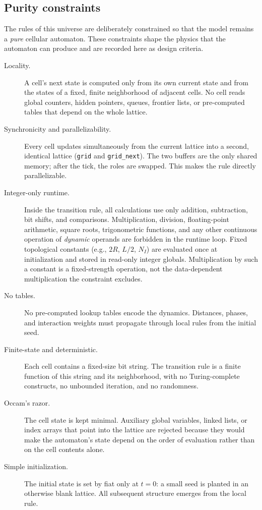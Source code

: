 \documentclass{ijuc}
\begin{document}
\subsection{Purity constraints}
\label{subsec:purity}

The rules of this universe are deliberately constrained so that the model remains a \emph{pure} cellular automaton. These constraints shape the physics that the automaton can produce and are recorded here as design criteria.

\begin{description}
\item[Locality.] A cell's next state is computed only from its own current state and from the states of a fixed, finite neighborhood of adjacent cells. No cell reads global counters, hidden pointers, queues, frontier lists, or pre-computed tables that depend on the whole lattice.
\item[Synchronicity and parallelizability.] Every cell updates simultaneously from the current lattice into a second, identical lattice (\texttt{grid} and \texttt{grid\_next}). The two buffers are the only shared memory; after the tick, the roles are swapped. This makes the rule directly parallelizable.
\item[Integer-only runtime.] Inside the transition rule, all calculations use only addition, subtraction, bit shifts, and comparisons. Multiplication, division, floating-point arithmetic, square roots, trigonometric functions, and any other continuous operation of \emph{dynamic} operands are forbidden in the runtime loop. Fixed topological constants (e.g., $2R$, $L/2$, $N_I$) are evaluated once at initialization and stored in read-only integer globals. Multiplication by such a constant is a fixed-strength operation, not the data-dependent multiplication the constraint excludes.
\item[No tables.] No pre-computed lookup tables encode the dynamics. Distances, phases, and interaction weights must propagate through local rules from the initial seed.
\item[Finite-state and deterministic.] Each cell contains a fixed-size bit string. The transition rule is a finite function of this string and its neighborhood, with no Turing-complete constructs, no unbounded iteration, and no randomness.
\item[Occam's razor.] The cell state is kept minimal. Auxiliary global variables, linked lists, or index arrays that point into the lattice are rejected because they would make the automaton's state depend on the order of evaluation rather than on the cell contents alone.
\item[Simple initialization.] The initial state is set by fiat only at $t=0$: a small seed is planted in an otherwise blank lattice. All subsequent structure emerges from the local rule.
\end{description}
\end{document}
